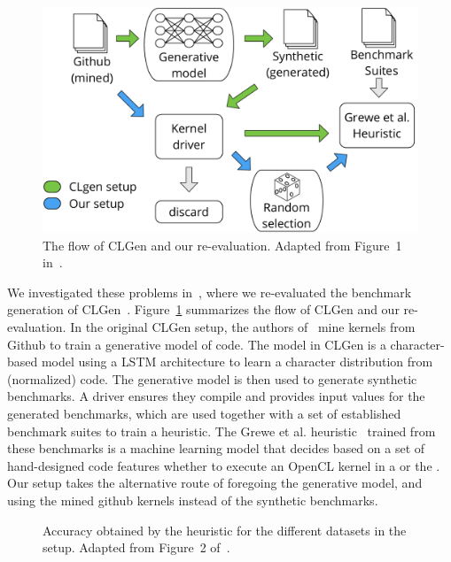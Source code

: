\begin{figure}[h]
	\centering
	\includegraphics[width=.9\textwidth]{figures/clgen_flow.pdf}
	\caption{The flow of CLGen and our re-evaluation. Adapted from Figure~1 in~\cite{goens_mapl19}.}
	\label{fig:clgen_flow}
\end{figure}

We investigated these problems in~\cite{goens_mapl19}, where we re-evaluated the benchmark generation of CLGen~\cite{cummins_cgo2017}.
Figure~\ref{fig:clgen_flow} summarizes the flow of CLGen and our re-evaluation.
In the original CLGen setup, the authors of~\cite{cummins_cgo2017} mine kernels from Github to train a generative model of code.
The model in CLGen is a character-based model using a \ac{LSTM}\cite{lstm} architecture to learn a character distribution from (normalized) code.
The generative model is then used to generate synthetic benchmarks. A driver ensures they compile and provides input values for the generated benchmarks, which are used together with a set of established benchmark suites to train a heuristic.
The Grewe et al. heuristic~\cite{grewe_cgo13} trained from these benchmarks is a machine learning model that decides based on a set of hand-designed code features whether to execute an OpenCL kernel in a  or the . 
Our setup takes the alternative route of foregoing the generative model, and using the mined github kernels instead of the synthetic benchmarks.

\begin{figure}[h]
	\centering
\resizebox{0.95\textwidth}{!}{
     
     }
   \caption{Accuracy obtained by the heuristic for the different datasets in the setup. Adapted from Figure~2 of~\cite{goens_mapl19}.}
   \label{fig:clgen_accuracy}
\end{figure}

